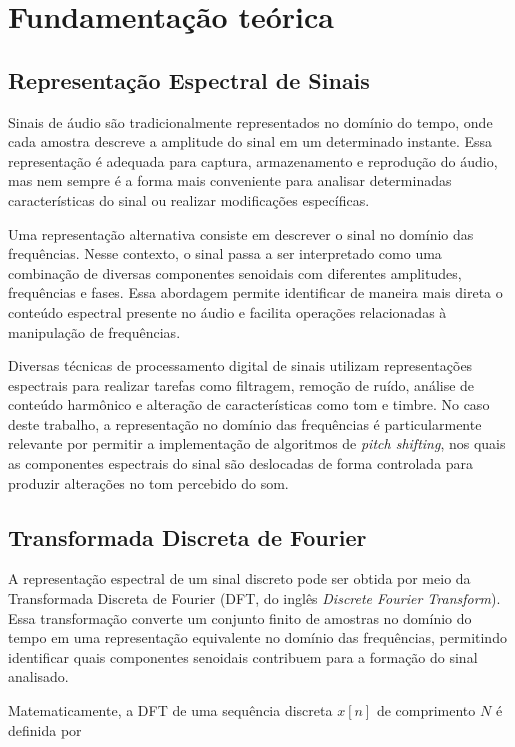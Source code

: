 \section{Fundamentação teórica}\label{sec:fundamentacao}

\subsection{Representação Espectral de Sinais}

Sinais de áudio são tradicionalmente representados no domínio do tempo, onde cada amostra descreve a amplitude do sinal em um determinado instante. Essa representação é adequada para captura, armazenamento e reprodução do áudio, mas nem sempre é a forma mais conveniente para analisar determinadas características do sinal ou realizar modificações específicas.

Uma representação alternativa consiste em descrever o sinal no domínio das frequências. Nesse contexto, o sinal passa a ser interpretado como uma combinação de diversas componentes senoidais com diferentes amplitudes, frequências e fases. Essa abordagem permite identificar de maneira mais direta o conteúdo espectral presente no áudio e facilita operações relacionadas à manipulação de frequências.

Diversas técnicas de processamento digital de sinais utilizam representações espectrais para realizar tarefas como filtragem, remoção de ruído, análise de conteúdo harmônico e alteração de características como tom e timbre. No caso deste trabalho, a representação no domínio das frequências é particularmente relevante por permitir a implementação de algoritmos de \textit{pitch shifting}, nos quais as componentes espectrais do sinal são deslocadas de forma controlada para produzir alterações no tom percebido do som.

\subsection{Transformada Discreta de Fourier}

A representação espectral de um sinal discreto pode ser obtida por meio da Transformada Discreta de Fourier (DFT, do inglês \textit{Discrete Fourier Transform}). Essa transformação converte um conjunto finito de amostras no domínio do tempo em uma representação equivalente no domínio das frequências, permitindo identificar quais componentes senoidais contribuem para a formação do sinal analisado.

Matematicamente, a DFT de uma sequência discreta \(x[n]\) de comprimento \(N\) é definida por


